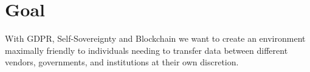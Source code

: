 \section{Goal}
With GDPR, Self-Sovereignty and Blockchain we want to create an environment maximally friendly to individuals needing to transfer data between different vendors, governments, and institutions at their own discretion.	
	


